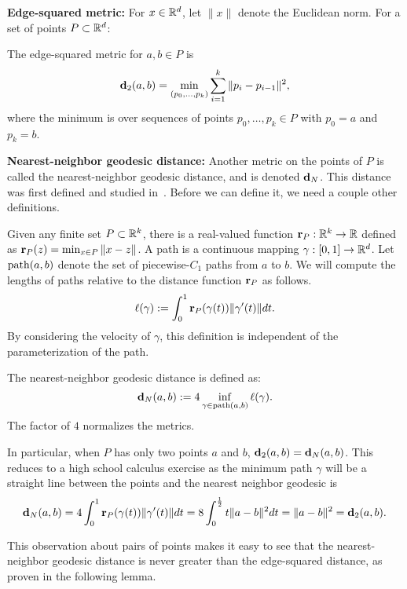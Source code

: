 \noindent \textbf{Edge-squared metric:}  For $x\in \mathbb{R}^d$, let $\|x\|$ denote the Euclidean norm.
  For a set of points $P\subset \mathbb{R}^d$:

  \begin{definition}
  The edge-squared metric for $a,b\in P$ is
  \[
    \mathbf{d}_2(a,b) = \min_{(p_0,\ldots, p_k)}\sum_{i=1}^k \|p_i - p_{i-1}\|^2,
  \]
  where the minimum is over sequences of points $p_0,\ldots, p_k\in P$ with $p_0 = a$ and $p_k = b$.
  \end{definition}

\vspace{3 mm}
\noindent \textbf{Nearest-neighbor geodesic distance:}
  Another metric on the points of $P$ is called the nearest-neighbor
  geodesic distance, and is denoted $\mathbf{d}_N$.
This distance was first defined and studied
  in~\cite{cohen15approximating}.
  Before we can define it, we need a couple other definitions.

  Given any finite set $P\subset \mathbb{R}^k$, there is a real-valued function $\mathbf{r}_P: \mathbb{R}^k\to \mathbb{R}$ defined as $\mathbf{r}_P(z) = \min_{x\in P} \|x-z\|$.
  A path is a continuous mapping $\gamma:[0,1]\to \mathbb{R}^d$.
  Let $\mathrm{path}(a,b)$ denote the set of piecewise-$C_1$ paths from $a$ to $b$.
  We will compute the lengths of paths relative to the distance function $\mathbf{r}_P$ as follows.
  \[
    \ell(\gamma) := \int_0^1 \mathbf{r}_P(\gamma(t))\|\gamma'(t)\|dt.
  \]
  By considering the velocity of $\gamma$, this definition is
  independent of the parameterization of the path.
  \begin{definition}
    The nearest-neighbor geodesic distance is defined as:
  \[
    \mathbf{d}_N(a,b) := 4 \inf_{\gamma\in \mathrm{path}(a,b)}\ell(\gamma).
  \]
  The factor of $4$ normalizes the metrics.
  \end{definition}
  In particular, when $P$ has only two points $a$ and $b$, $\mathbf{d}_2(a,b) = \mathbf{d}_N(a,b)$.
  This reduces to a high school calculus exercise as the minimum path
  $\gamma$ will be a straight line between the points and the nearest
  neighbor geodesic is
  \[
    \mathbf{d}_N(a,b) = 4\int_0^1 \mathbf{r}_P(\gamma(t))\|\gamma'(t)\|dt = 8\int_0^{\frac{1}{2}} t \|a - b\|^2 dt = \|a - b\|^2 = \mathbf{d}_2(a,b).
  \]

  This observation about pairs of points makes it easy to see that the
  nearest-neighbor geodesic distance is never greater than the
  edge-squared distance, as proven in the following lemma.

